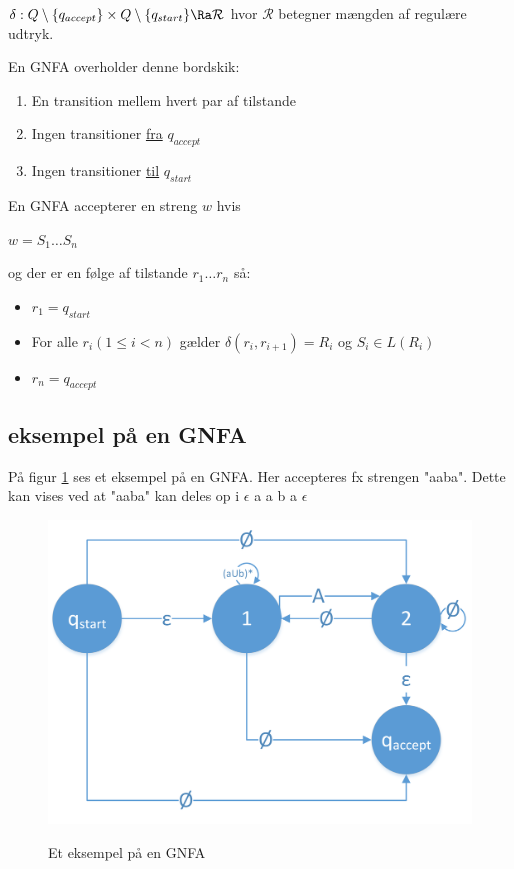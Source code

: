 \documentclass[a4paper,10pt,article]{memoir}
\begin{document}
$\delta: Q\setminus\{q_{accept}\}\times Q\setminus\{q_{start}\} \Ra \mathcal{R}$
hvor $\mathcal{R}$ betegner mængden af regulære udtryk.

En GNFA overholder denne bordskik:
\begin{enumerate}
\item En transition mellem hvert par af tilstande
\item Ingen transitioner \underline{fra} $q_{accept}$
\item Ingen transitioner \underline{til} $q_{start}$
\end{enumerate}
En GNFA accepterer en streng $w$ hvis 

$w = S_1 \dots S_n$

og der er en følge af tilstande $r_1 \dots r_n$ så:
\begin{itemize}
\item $r_1 = q_{start}$
\item For alle $r_i (1 \leq i < n)$ gælder $\delta (r_i, r_{i+1})=R_i$ og $S_i \in L(R_i)$
\item $r_n = q_{accept}$
\end{itemize}

\subsection{eksempel på en GNFA}
På figur \ref{fig:fig17} ses et eksempel på en GNFA. Her accepteres fx strengen "aaba". Dette kan vises ved at "aaba" kan deles op i $\epsilon$ a a b a $\epsilon$
\begin{figure}[h]%
\centering
\includegraphics[width=\textwidth]{Fig17x.png}
\label{fig:fig17}
\caption{Et eksempel på en GNFA}
\end{figure}
\end{document}
